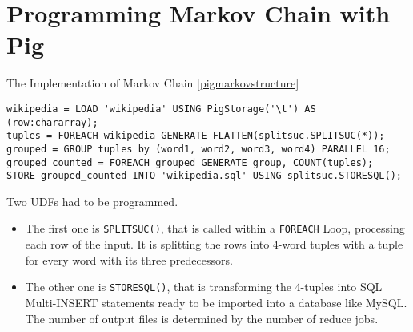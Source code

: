 \section{Programming Markov Chain with Pig}                                              

The Implementation of Markov Chain \ref{pigmarkovstructure}   
                         
\begin{lstlisting}[language=pig,caption=Markov Chain in Pig Latin,label=pigmarkovstructure]    
wikipedia = LOAD 'wikipedia' USING PigStorage('\t') AS (row:chararray);
tuples = FOREACH wikipedia GENERATE FLATTEN(splitsuc.SPLITSUC(*));
grouped = GROUP tuples by (word1, word2, word3, word4) PARALLEL 16;
grouped_counted = FOREACH grouped GENERATE group, COUNT(tuples);
STORE grouped_counted INTO 'wikipedia.sql' USING splitsuc.STORESQL();
\end{lstlisting}

Two UDFs had to be programmed. 
\begin{itemize}
\item The first one is {\tt SPLITSUC()}, that is called within a {\tt FOREACH} Loop, processing each row of the input. It is splitting the rows into 4-word tuples with a tuple for every word with its three predecessors.
\item The other one is {\tt STORESQL()}, that is transforming the 4-tuples into SQL Multi-INSERT statements ready to be imported into a database like MySQL. The number of output files is determined by the number of reduce jobs.
\end{itemize}





